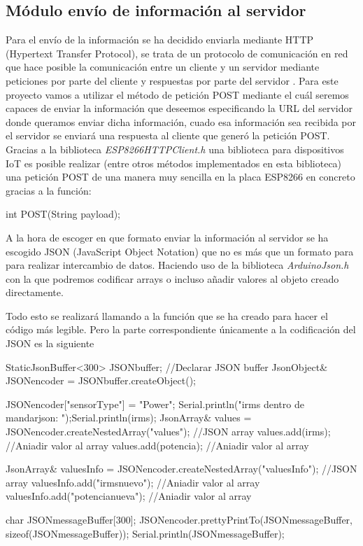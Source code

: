 \subsection{Módulo envío de información al servidor}

Para el envío de la información se ha decidido enviarla mediante HTTP (Hypertext Transfer Protocol), se trata de un protocolo de comunicación en red que hace posible la comunicación entre un cliente y un servidor mediante peticiones por parte del cliente y respuestas por parte del servidor \cite{httpinfo}. Para este proyecto vamos a utilizar el método de petición POST mediante el cuál seremos capaces de enviar la información que deseemos especificando la URL del servidor donde queramos enviar dicha información, cuado esa información sea recibida por el servidor se enviará una respuesta al cliente que generó la petición POST.  Gracias a la biblioteca \textit{ESP8266HTTPClient.h} \cite{httpclientgithub} una biblioteca para dispositivos IoT es posible realizar (entre otros métodos implementados en esta biblioteca) una petición POST de una manera muy sencilla en la placa ESP8266 en concreto gracias a la función:

\begin{listing}[style=consola, numbers=none]
	int POST(String payload);
\end{listing} 

A la hora de escoger en que formato enviar la información al servidor se ha escogido JSON (JavaScript Object Notation) que no es más que un formato para para realizar intercambio de datos. Haciendo uso de la biblioteca \textit{ArduinoJson.h} \cite{jsongithub} con la que podremos codificar arrays o incluso añadir valores al objeto creado directamente. 

Todo esto se realizará llamando a la función que se ha creado para hacer el código más legible. Pero la parte correspondiente únicamente a la codificación del JSON es la siguiente 

\begin{listing}[style=consola, numbers=none]
	StaticJsonBuffer<300> JSONbuffer;   //Declarar JSON buffer
	JsonObject& JSONencoder = JSONbuffer.createObject();
	
	JSONencoder["sensorType"] = "Power";
	Serial.println("irms dentro de mandarjson: ");Serial.println(irms);
	JsonArray& values = JSONencoder.createNestedArray("values"); //JSON array
	values.add(irms); //Aniadir valor al array
	values.add(potencia); //Aniadir valor al array
	
	JsonArray& valuesInfo = JSONencoder.createNestedArray("valuesInfo"); //JSON array
	valuesInfo.add("irmsnuevo"); //Aniadir valor al array
	valuesInfo.add("potencianueva"); //Aniadir valor al array
	
	char JSONmessageBuffer[300];
	JSONencoder.prettyPrintTo(JSONmessageBuffer, sizeof(JSONmessageBuffer));
	Serial.println(JSONmessageBuffer);


\end{listing} 




